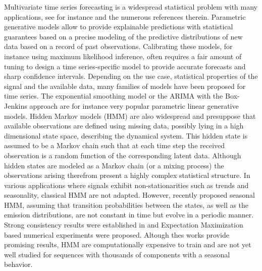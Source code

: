 \documentclass{article} %
\begin{document}
Multivariate time series forecasting is a widespread statistical problem with  many applications, see for instance \citep{sarkka2013bayesian, douc2014nonlinear, zucchini2017hidden} and the numerous references therein.
 Parametric generative models allow to provide explainable predictions with statistical guarantees based on a precise modeling of the predictive distributions of new data based on a record of past observations. %
Calibrating these models, for instance using maximum likelihood inference, often requires a fair amount of tuning to design a time series-specific model to provide  accurate forecasts and sharp confidence intervals.  Depending on the use case, statistical properties of the signal and the available data, many families of models have been proposed for time series.  The exponential smoothing model \citep{RePEc:inm:oropre:v:9:y:1961:i:5:p:673-685} or the ARIMA with the Box-Jenkins approach \citep{box2015time} are for instance very popular parametric linear generative models.  Hidden Markov models (HMM) are also widespread and presuppose that available observations are defined using missing data, possibly lying in a high dimensional state space, describing the dynamical system. This hidden state is assumed to be a Markov chain such that at each time step the received observation is a random function of the corresponding latent data.  Although hidden states are modeled as a Markov chain (or a mixing process)  the observations arising therefrom present a highly complex statistical structure. %
 In various applications where signals exhibit non-stationarities such as trends and seasonality, classical HMM are not adapted. However, \citep{touron2017modeling}  recently proposed seasonal HMM, assuming that transition probabilities between the states, as well as the emission distributions, are not constant in time but evolve in a periodic manner. Strong consistency results were established in \citep{touron2019consistency} and Expectation Maximization based numerical experiments were proposed.
Altough thes works provide promising results, HMM are computationally expensive to train and are not yet well studied for sequences with thousands of components with a seasonal behavior.
 
\end{document}
